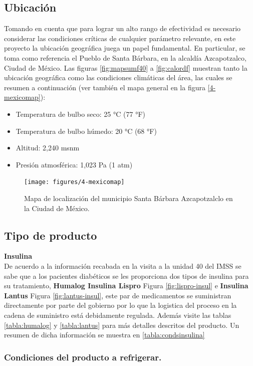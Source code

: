 \subsection{Ubicación}
Tomando en cuenta que para lograr un alto rango de efectividad es necesario considerar las condiciones críticas de cualquier parámetro relevante, en este proyecto la ubicación geográfica juega un papel fundamental. En particular, se toma como referencia el Pueblo de Santa Bárbara, en la alcaldía Azcapotzalco, Ciudad de México. Las figuras  \ref{fig:mapsumf40} a \ref{fig:calordf} muestran tanto la ubicación geográfica como las condiciones climáticas del área, las cuales se resumen a continuación (ver también el mapa general en la figura \ref{4-mexicomap}):


\begin{itemize}
	\item Temperatura de bulbo seco: 25 °C (77 °F)\rspitems
	\item Temperatura de bulbo húmedo: 20 °C (68 °F)	\rspitems
	\item Altitud: 2,240 msnm \rspitems
	\item Presión atmosférica: 1,023 Pa (1 atm)\rspitems
\end{itemize}

\begin{figure}[H]
	\centering
	\texttt{[image: figures/4-mexicomap]}
	\caption{Mapa de localización del municipio Santa Bárbara Azcapotzalclo en la Ciudad de México.}\cite{semovi-24}
	\label{fig:4-mexicomap}
\end{figure}

\subsection{Tipo de producto}
\textbf{Insulina}\\
De acuerdo a la información recabada en la visita a la unidad 40 del IMSS se sabe que a los pacientes diabéticos se les proporciona dos tipos de insulina para su tratamiento, \textbf{Humalog Insulina Lispro} Figura \ref{fig:lispro-insul} e \textbf{Insulina Lantus}  Figura \ref{fig:lantus-insul}, este par de medicamentos se suministran directamente por parte del gobierno por lo que la logistica del proceso en la cadena de suministro está debidamente regulada. Además visite las tablas \ref{tabla:humalog} y \ref{tabla:lantus} para más detalles descritos del producto. Un resumen de dicha información se muestra en \ref{tabla:condsinsulina}

\subsubsection{Condiciones del producto a refrigerar.}


